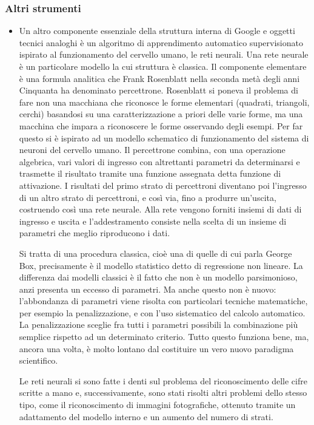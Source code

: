 \documentclass[xcolor=svgnames]{beamer}
\begin{document}
\begin{frame}\small\frametitle{Altri strumenti}
 
  \begin{itemize}
    \item 
Un altro componente essenziale della struttura interna di Google e oggetti tecnici analoghi è un algoritmo di apprendimento automatico supervisionato ispirato al funzionamento del cervello umano, le reti neurali. Una rete neurale è un particolare modello la cui struttura è classica. Il componente elementare è una formula analitica che Frank Rosenblatt nella seconda metà degli anni Cinquanta ha denominato percettrone. Rosenblatt si poneva il problema di fare non una macchiana che riconosce le forme elementari (quadrati, triangoli, cerchi) basandosi su una caratterizzazione a priori delle varie forme, ma una macchina che impara a riconoscere le forme osservando degli esempi. Per far questo si è ispirato ad un modello schematico di funzionamento del sistema di neuroni del cervello umano. Il percettrone combina, con una operazione algebrica, vari valori di ingresso con altrettanti parametri da determinarsi e trasmette il risultato tramite una funzione assegnata detta funzione di attivazione. I risultati del primo strato di percettroni diventano poi l'ingresso di un altro strato di percettroni, e così via, fino a produrre un'uscita, costruendo così una rete neurale. Alla rete vengono forniti insiemi di dati di ingresso e uscita e l'addestramento consiste nella scelta di un insieme di parametri che meglio riproducono i dati.

Si tratta di una procedura classica, cioè una di quelle di cui parla George Box, precisamente è il modello statistico detto di regressione non lineare. La differenza dai modelli classici è il fatto che non è un modello parsimonioso, anzi presenta un eccesso di parametri. Ma anche questo non è nuovo: l'abbondanza di parametri viene risolta con particolari tecniche matematiche, per esempio la penalizzazione, e con l'uso sistematico del calcolo automatico. La penalizzazione sceglie fra tutti i parametri possibili la combinazione più semplice rispetto ad un determinato criterio. Tutto questo funziona bene, ma, ancora una volta, è molto lontano dal costituire un vero nuovo paradigma scientifico.

Le reti neurali si sono fatte i denti sul problema del riconoscimento delle cifre scritte a mano e, successivamente, sono stati risolti altri problemi dello stesso tipo, come il riconoscimento di immagini fotografiche, ottenuto tramite un adattamento del modello interno e un aumento del numero di strati.


\end{itemize}
\end{frame}
\end{document}

